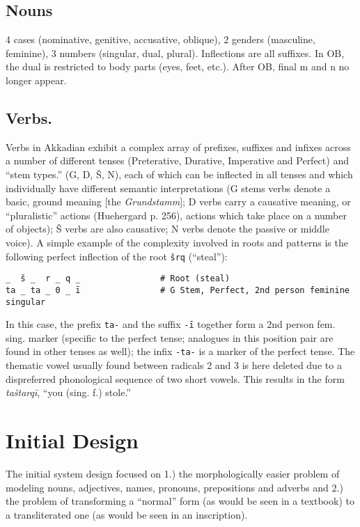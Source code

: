 \documentclass[11pt,letterpaper]{article}
\begin{document}
\subsection{Nouns}

4 cases (nominative, genitive, accusative, oblique), 2 genders (masculine, feminine), 3 numbers (singular, dual, plural).  Inflections are all suffixes.  In OB, the dual is restricted to body parts (eyes, feet, etc.).  After OB, final m and n no longer appear.

\subsection{Verbs.} Verbs in Akkadian exhibit a complex array of prefixes, suffixes and infixes across a number of different tenses (Preterative, Durative, Imperative and Perfect) and ``stem types.''  (G, D, Š, N), each of which can be inflected in all tenses and which individually have different semantic interpretations (G stems verbs denote a basic, ground meaning [the \emph{Grundstamm}]; D verbs carry a causative meaning, or ``pluralistic'' actions (Huehergard p. 256), actions which take place on a number of objects);  Š verbs are also causative; N verbs denote the passive or middle voice).  A simple example of the complexity involved in roots and patterns is the following perfect inflection of the root  \texttt{šrq} (``steal''):

\begin{verbatim}
_  š _  r _ q _                # Root (steal)
ta _ ta _ 0 _ ī                # G Stem, Perfect, 2nd person feminine singular
\end{verbatim}

In this case, the prefix \texttt{ta-} and the suffix \texttt{-ī} together form a 2nd person fem. sing. marker (specific to the perfect tense; analogues in this position pair are found in other tenses as well); the infix \texttt{-ta-} is a marker of the perfect tense.  The thematic vowel usually found between radicals 2 and 3 is here deleted due to a dispreferred phonological sequence of two short vowels.  This results in the form \emph{taštarqī},  ``you (sing. f.) stole.''

\section{Initial Design}


The initial system design focused on 1.) the morphologically easier problem of modeling nouns, adjectives, names, pronouns, prepositions and adverbs and 2.) the problem of transforming a ``normal'' form (as would be seen in a textbook) to a transliterated one (as would be seen in an inscription).
\end{document}
